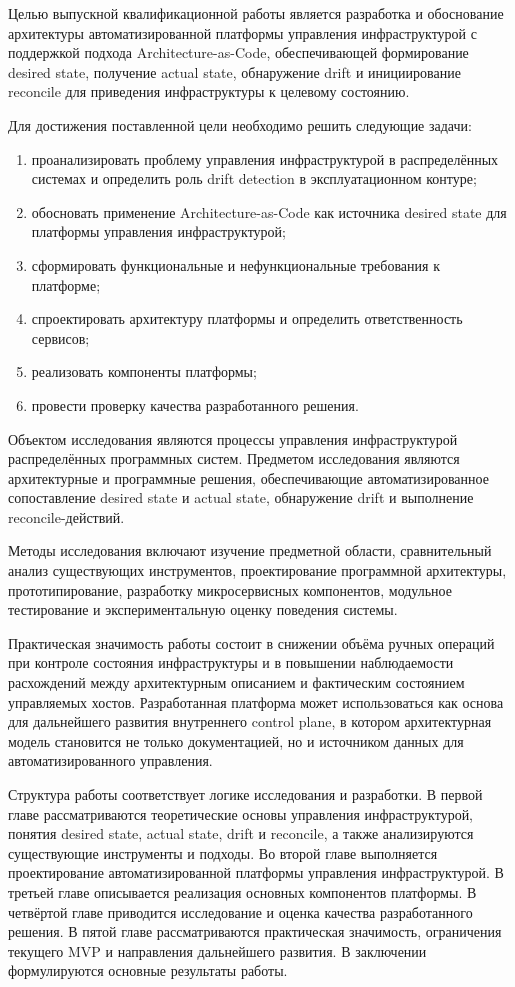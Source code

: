 Целью выпускной квалификационной работы является разработка и обоснование архитектуры автоматизированной платформы управления инфраструктурой с поддержкой подхода Architecture-as-Code, обеспечивающей формирование desired state, получение actual state, обнаружение drift и инициирование reconcile для приведения инфраструктуры к целевому состоянию.

Для достижения поставленной цели необходимо решить следующие задачи:
\begin{enumerate}
    \item проанализировать проблему управления инфраструктурой в распределённых системах и определить роль drift detection в эксплуатационном контуре;
    \item обосновать применение Architecture-as-Code как источника desired state для платформы управления инфраструктурой;
    \item сформировать функциональные и нефункциональные требования к платформе;
    \item спроектировать архитектуру платформы и определить ответственность сервисов;
    \item реализовать компоненты платформы;
    \item провести проверку качества разработанного решения.
\end{enumerate}

Объектом исследования являются процессы управления инфраструктурой распределённых программных систем. Предметом исследования являются архитектурные и программные решения, обеспечивающие автоматизированное сопоставление desired state и actual state, обнаружение drift и выполнение reconcile-действий.

Методы исследования включают изучение предметной области, сравнительный анализ существующих инструментов, проектирование программной архитектуры, прототипирование, разработку микросервисных компонентов, модульное тестирование и экспериментальную оценку поведения системы.

Практическая значимость работы состоит в снижении объёма ручных операций при контроле состояния инфраструктуры и в повышении наблюдаемости расхождений между архитектурным описанием и фактическим состоянием управляемых хостов. Разработанная платформа может использоваться как основа для дальнейшего развития внутреннего control plane, в котором архитектурная модель становится не только документацией, но и источником данных для автоматизированного управления.

Структура работы соответствует логике исследования и разработки. В первой главе рассматриваются теоретические основы управления инфраструктурой, понятия desired state, actual state, drift и reconcile, а также анализируются существующие инструменты и подходы. Во второй главе выполняется проектирование автоматизированной платформы управления инфраструктурой. В третьей главе описывается реализация основных компонентов платформы. В четвёртой главе приводится исследование и оценка качества разработанного решения. В пятой главе рассматриваются практическая значимость, ограничения текущего MVP и направления дальнейшего развития. В заключении формулируются основные результаты работы.
